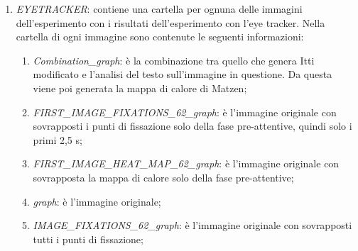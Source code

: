 \documentclass[%
	corpo=12pt,
    twoside,
    stile=classica,
    oldstyle,
    tipotesi=custom,
    greek,
    evenboxes,
]{toptesi}
\begin{document}
{\begin{itemize}
\begin{enumerate}
\begin{enumerate}
\begin{enumerate}
			\item \textit{RETTANGOLO\_900\_10\_graph}: immagine contenente solo i 900 rettangoli in cui l’immagine è stata suddivisa con all’interno scritto il numero di punti di fissazione (solo per quelli che ne hanno almeno 10);
			\item \textit{RETTANGOLO\_900\_20\_graph}: immagine contenente solo i 900 rettangoli in cui l’immagine è stata suddivisa con all’interno scritto il numero di punti di fissazione (solo per quelli che ne hanno almeno 20);
			\item \textit{RETTANGOLO\_900\_30\_graph}: immagine contenente solo i 900 rettangoli in cui l’immagine è stata suddivisa con all’interno scritto il numero di punti di fissazione (solo per quelli che ne hanno almeno 30).
			\end{enumerate}
		\item \textit{DIREZIONE\_PREATTENTIVE}: contiene le stesse informazioni di quella precedente, ma è concentrata solo nel primo secondo di fissazione. In pratica per ogni osservatore abbiamo conservato solo i punti relativi al primo secondo di fissazione. Nelle singole cartelle di ogni immagine, non c’è l’informazione sulla mappa di calore, ma è inserita in più l’immagine \textit{\“RETTANGOLO\_900\_graph0\”} che contiene l’informazione sulla distribuzione dei punti di fissazione senza tenere conto di nessuna soglia con cui scrivere i numeri nei rettangoli.
		\end{enumerate}
	\item \textit{EYETRACKER}: contiene una cartella per ognuna delle immagini dell’esperimento con i risultati dell’esperimento con l’eye tracker. Nella cartella di ogni immagine sono contenute le seguenti informazioni:
		\begin{enumerate}
		\item \textit{Combination\_graph}: è la combinazione tra quello che genera Itti modificato e l’analisi del testo sull’immagine in questione. Da questa viene poi generata la mappa di calore di Matzen;
		\item \textit{FIRST\_IMAGE\_FIXATIONS\_62\_graph}: è l’immagine originale con sovrapposti i punti di fissazione solo della fase pre-attentive, quindi solo i primi 2,5 s;
		\item \textit{FIRST\_IMAGE\_HEAT\_MAP\_62\_graph}: è l’immagine originale con sovrapposta la mappa di calore solo della fase pre-attentive;
		\item \textit{graph}: è l’immagine originale;
		\item \textit{IMAGE\_FIXATIONS\_62\_graph}: è l’immagine originale con sovrapposti tutti i punti di fissazione;

\end{enumerate}
\end{enumerate}
\end{itemize}}
\end{document}
